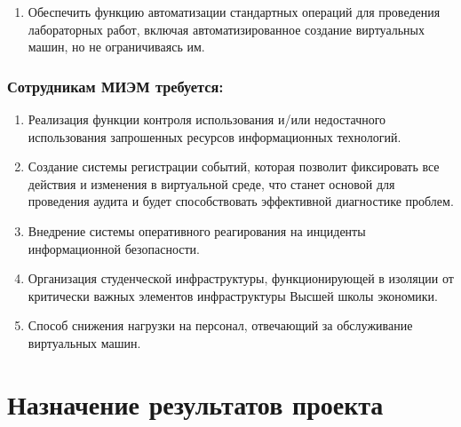 \documentclass[14pt, a4paper]{extarticle}
\begin{document}
\begin{enumerate}
\item Обеспечить функцию автоматизации стандартных операций для проведения лабораторных работ, включая автоматизированное создание виртуальных машин, но не ограничиваясь им.
\end{enumerate}

\subsubsection*{Сотрудникам МИЭМ требуется:}

\begin{enumerate}
\item Реализация функции контроля использования и/или недостачного использования запрошенных ресурсов информационных технологий.
\item Создание системы регистрации событий, которая позволит фиксировать все действия и изменения в виртуальной среде, что станет основой для проведения аудита и будет способствовать эффективной диагностике проблем.
\item Внедрение системы оперативного реагирования на инциденты информационной безопасности.
\item Организация студенческой инфраструктуры, функционирующей в изоляции от критически важных элементов инфраструктуры Высшей школы экономики.
\item Способ снижения нагрузки на персонал, отвечающий за обслуживание виртуальных машин.
\end{enumerate}

\section{Назначение результатов проекта}
\end{document}
